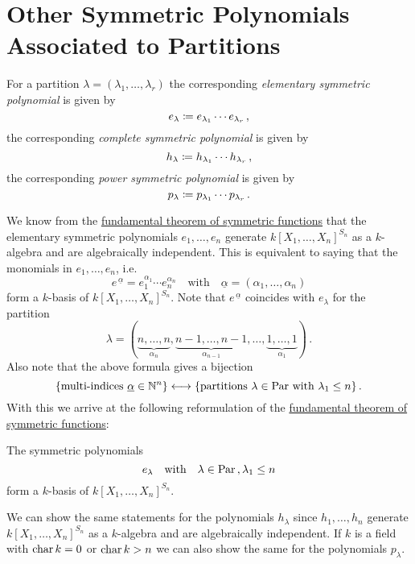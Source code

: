 \section{Other Symmetric Polynomials Associated to Partitions}


\begin{definition}
  For a partition $\lambda = (\lambda_1, \dotsc, \lambda_r)$ the corresponding \emph{elementary symmetric polynomial} is given by
  \[
              e_\lambda
    \coloneqq  e_{\lambda_1} \dotsm e_{\lambda_r} \,,
  \]
  the corresponding \emph{complete symmetric polynomial} is given by
  \[
              h_\lambda
    \coloneqq  h_{\lambda_1} \dotsm h_{\lambda_r} \,,
  \]
  the corresponding \emph{power symmetric polynomial} is given by
  \[
              p_\lambda
    \coloneqq  p_{\lambda_1} \dotsm p_{\lambda_r} \,.
  \]
\end{definition}


\begin{fluff}
  We know from the \hyperref[theorem: fundamental theorem of symmetric functions]{fundamental theorem of symmetric functions} that the elementary symmetric polynomials $e_1, \dotsc, e_n$ generate $k[X_1, \dotsc, X_n]^{S_n}$ as a $k$-algebra and are algebraically independent. This is equivalent to saying that the monomials in $e_1, \dotsc, e_n$, i.e.\
  \[
      e^{\,\underline{\alpha}}
    = e_1^{\alpha_1} \dotsm e_n^{\alpha_n}
    \quad\text{with}\quad
      \underline{\alpha}
    = (\alpha_1, \dotsc, \alpha_n)
  \]
  form a $k$-basis of $k[X_1, \dotsc, X_n]^{S_n}$.
  Note that $e^{\,\underline{\alpha}}$ coincides with $e_\lambda$ for the partition
  \[
    \lambda
  = (
      \underbrace{n, \dotsc, n}_{\alpha_n},
      \underbrace{n-1, \dotsc, n-1}_{\alpha_{n-1}},
      \dotsc,
      \underbrace{1, \dotsc, 1}_{\alpha_1}
    ) \,.
  \]
  Also note that the above formula gives a bijection
  \[
    \{ \text{multi-indices $\underline{\alpha} \in \mathbb{N}^n$} \}
    \longleftrightarrow
    \{ \text{partitions $\lambda \in \operatorname{Par}$ with $\lambda_1 \leq n$} \} \,.
  \]
  With this we arrive at the following reformulation of the \hyperref[theorem: fundamental theorem of symmetric functions]{fundamental theorem of symmetric functions}:
\end{fluff}


\begin{corollary}
  The symmetric polynomials
  \[
      e_\lambda
    \quad\text{with}\quad
      \lambda \in \operatorname{Par} \,,
      \lambda_1 \leq n
  \]
  form a $k$-basis of $k[X_1, \dotsc, X_n]^{S_n}$.
\end{corollary}


\begin{remark}
  We can show the same statements for the polynomials $h_\lambda$ since $h_1, \dotsc, h_n$ generate $k[X_1, \dotsc, X_n]^{S_n}$ as a $k$-algebra and are algebraically independent.
  If $k$ is a field with $\operatorname{char} k = 0$ or $\operatorname{char} k > n$ we can also show the same for the polynomials $p_\lambda$.
\end{remark}






